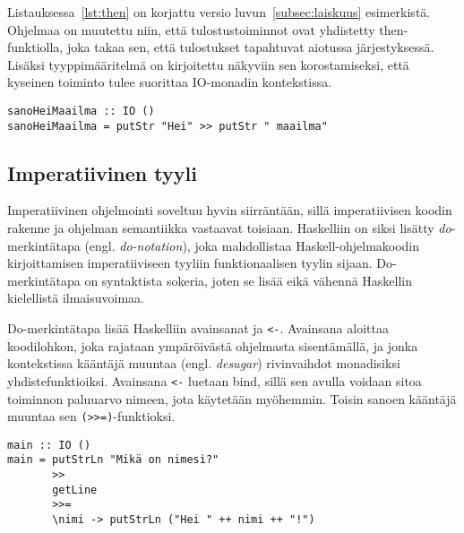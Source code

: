 \documentclass[finnish]{tktltiki2}
\begin{document}

Listauksessa~\ref{lst:then} on korjattu versio luvun~\ref{subsec:laiskuus} esimerkistä. Ohjelmaa on
muutettu niin, että tulostustoiminnot ovat yhdistetty then-funktiolla, joka takaa sen, että
tulostukset tapahtuvat aiotussa järjestyksessä. Lisäksi tyyppimääritelmä on kirjoitettu näkyviin sen
korostamiseksi, että kyseinen toiminto tulee suorittaa IO-monadin kontekstissa.

\begin{lstlisting}[float,label={lst:then},caption={Fixme}]
sanoHeiMaailma :: IO ()
sanoHeiMaailma = putStr "Hei" >> putStr " maailma"
\end{lstlisting}

\subsection{Imperatiivinen tyyli}

Imperatiivinen ohjelmointi soveltuu hyvin siirräntään, sillä imperatiivisen koodin rakenne ja
ohjelman semantiikka vastaavat toisiaan. Haskelliin on siksi lisätty \emph{do}-merkintätapa (engl.
\emph{do-notation}), joka mahdollistaa Haskell-ohjelmakoodin kirjoittamisen imperatiiviseen tyyliin
funktionaalisen tyylin sijaan. Do-merkintätapa on syntaktista sokeria, joten se lisää eikä vähennä
Haskellin kielellistä ilmaisuvoimaa.

Do-merkintätapa lisää Haskelliin avainsanat  ja \verb|<-|. Avainsana  aloittaa
koodilohkon, joka rajataan ympäröivästä ohjelmasta sisentämällä, ja jonka kontekstissa kääntäjä
muuntaa (engl. \emph{desugar}) rivinvaihdot monadisiksi yhdistefunktioiksi. Avainsana \verb|<-|
luetaan bind, sillä sen avulla voidaan sitoa toiminnon paluuarvo nimeen, jota käytetään myöhemmin.
Toisin sanoen kääntäjä muuntaa sen \verb|(>>=)|-funktioksi.

\begin{lstlisting}[float,label={lst:desugared},caption={Funktionaalinen tyyli}]
main :: IO ()
main = putStrLn "Mikä on nimesi?"
       >>
       getLine
       >>=
       \nimi -> putStrLn ("Hei " ++ nimi ++ "!")
\end{lstlisting}
\end{document}
